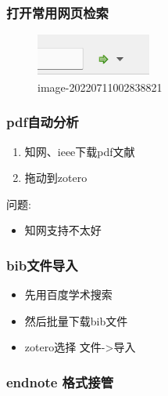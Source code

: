 \hypertarget{ux6253ux5f00ux5e38ux7528ux7f51ux9875ux68c0ux7d22}{%
\subsubsection{打开常用网页检索}\label{ux6253ux5f00ux5e38ux7528ux7f51ux9875ux68c0ux7d22}}

\begin{figure}
\centering
\includegraphics{zotero基础使用.assets/image-20220711002838821.png}
\caption{image-20220711002838821}
\end{figure}

\hypertarget{pdfux81eaux52a8ux5206ux6790}{%
\subsubsection{pdf自动分析}\label{pdfux81eaux52a8ux5206ux6790}}

\begin{enumerate}
\def\labelenumi{\arabic{enumi}.}
\tightlist
\item
  知网、ieee下载pdf文献
\item
  拖动到zotero
\end{enumerate}

问题:

\begin{itemize}
\tightlist
\item
  知网支持不太好
\end{itemize}

\hypertarget{bibux6587ux4ef6ux5bfcux5165}{%
\subsubsection{bib文件导入}\label{bibux6587ux4ef6ux5bfcux5165}}

\begin{itemize}
\tightlist
\item
  先用百度学术搜索
\item
  然后批量下载bib文件
\item
  zotero选择 文件-\textgreater 导入
\end{itemize}

\hypertarget{endnote-ux683cux5f0fux63a5ux7ba1}{%
\subsubsection{endnote
格式接管}\label{endnote-ux683cux5f0fux63a5ux7ba1}}

